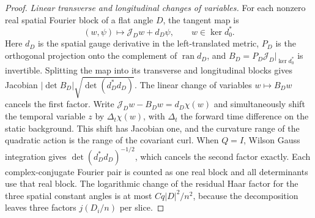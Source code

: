 \documentclass[11pt,a4paper]{article}
\numberwithin{equation}{section}
\begin{document}
\begin{proof}
\emph{Linear transverse and longitudinal changes of variables.}
For each nonzero real spatial Fourier block of a flat angle \(D\), the tangent map is
\[
 (w,\psi)\longmapsto \mathcal J_Dw+d_D\psi ,
                  \qquad w\in\ker d_0^* .
\]
Here \(d_D\) is the spatial gauge derivative in the left-translated metric, \(P_D\) is the orthogonal projection onto the complement of \(\operatorname{ran}d_D\), and \(B_D=P_D\mathcal J_D|_{\ker d_0^*}\) is invertible. Splitting the map into its transverse and longitudinal blocks gives Jacobian
\(\lvert\det B_D\rvert\sqrt{\det(d_D^*d_D)}\).
The linear change of variables \(w\mapsto B_Dw\) cancels the first factor. Write \(\mathcal J_Dw-B_Dw=d_D\chi(w)\) and simultaneously shift the temporal variable \(z\) by \(\Delta_t\chi(w)\), with \(\Delta_t\) the forward time difference on the static background. This shift has Jacobian one, and the curvature range of the quadratic action is the range of the covariant curl. When \(Q=I\), Wilson Gauss integration gives \(\det(d_D^*d_D)^{-1/2}\), which cancels the second factor exactly. Each complex-conjugate Fourier pair is counted as one real block and all determinants use that real block. The logarithmic change of the residual Haar factor for the three spatial constant angles is at most \(Cq|D|^2/n^2\), because the decomposition leaves three factors \(j(D_i/n)\) per slice.


\end{proof}
\end{document}
